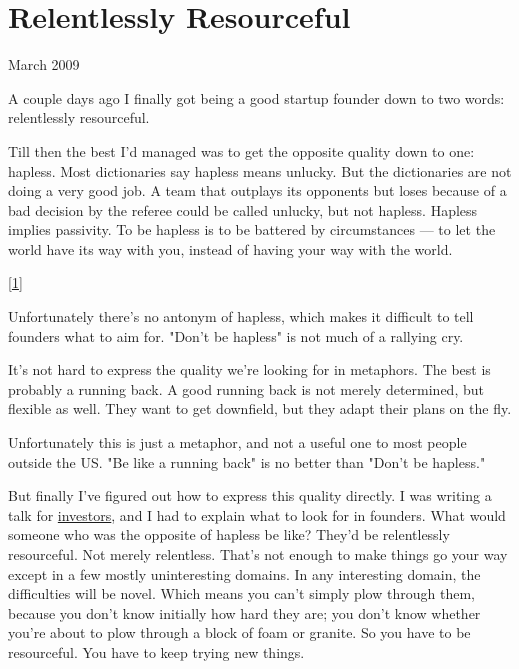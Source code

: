 \chapter{Relentlessly Resourceful}


            
              
                


                  
                    March 2009

A couple days ago I finally got being
                    a good startup founder down to two words: relentlessly
                    resourceful.

Till then the best I'd managed was
                    to get the opposite quality down to one: hapless. Most
                    dictionaries say hapless means unlucky. But the dictionaries
                    are not doing a very good job. A team that outplays its
                    opponents but loses because of a bad decision by the referee
                    could be called unlucky, but not hapless. Hapless implies
                    passivity. To be hapless is to be battered by circumstances
                    --- to let the world have its way with you, instead of
                    having your way with the world.
                    
                    [\href{\#f1n}{1}]

Unfortunately there's no antonym of hapless,
                    which makes it difficult to tell founders what to aim for.
                    "Don't be hapless" is not much of a rallying cry.

It's
                    not hard to express the quality we're looking for in
                    metaphors. The best is probably a running back. A good
                    running back is not merely determined, but flexible as well.
                    They want to get downfield, but they adapt their plans on
                    the fly.

Unfortunately this is just a metaphor,
                    and not a useful one to most people outside the US. "Be like
                    a running back" is no better than "Don't be hapless."

But
                    finally I've figured out how to express this quality
                    directly. I was writing a talk for
                    \href{http://www.paulgraham.com/angelinvesting.html}{investors}, and I had to
                    explain what to look for in founders. What would someone who
                    was the opposite of hapless be like? They'd be relentlessly
                    resourceful. Not merely relentless. That's not enough to
                    make things go your way except in a few mostly uninteresting
                    domains. In any interesting domain, the difficulties will be
                    novel. Which means you can't simply plow through them,
                    because you don't know initially how hard they are; you
                    don't know whether you're about to plow through a block of
                    foam or granite. So you have to be resourceful. You have to
                    keep trying new things.

